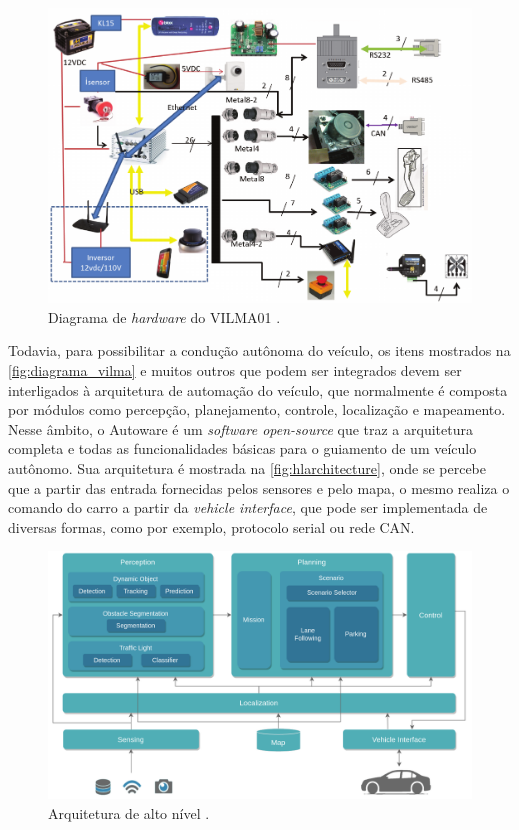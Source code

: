 \begin{figure}[H]
	\centering
	\includegraphics[width=0.75\linewidth]{img/diagrama_vilma}
	\caption{Diagrama de \textit{hardware} do VILMA01 \cite{bedoya_alise_2016}.}
	\label{fig:diagrama_vilma}
\end{figure}

Todavia, para possibilitar a condução autônoma do veículo, os itens mostrados na \autoref{fig:diagrama_vilma} e muitos outros que podem ser integrados devem ser interligados à arquitetura de automação do veículo, que normalmente é composta por módulos como percepção, planejamento, controle, localização e mapeamento. Nesse âmbito, o Autoware é um \textit{software open-source} que traz a arquitetura completa e todas as funcionalidades básicas para o guiamento de um veículo autônomo. Sua arquitetura é mostrada na \autoref{fig:hlarchitecture}, onde se percebe que a partir das entrada fornecidas pelos sensores e pelo mapa, o mesmo realiza o comando do carro a partir da \textit{vehicle interface}, que pode ser implementada de diversas formas, como por exemplo, protocolo serial ou rede CAN.

\begin{figure}
	\centering
	\includegraphics[width=0.8\linewidth]{img/HL_architecture}
	\caption{Arquitetura de alto nível \cite{autowareArchitecture}.}
	\label{fig:hlarchitecture}
\end{figure}

